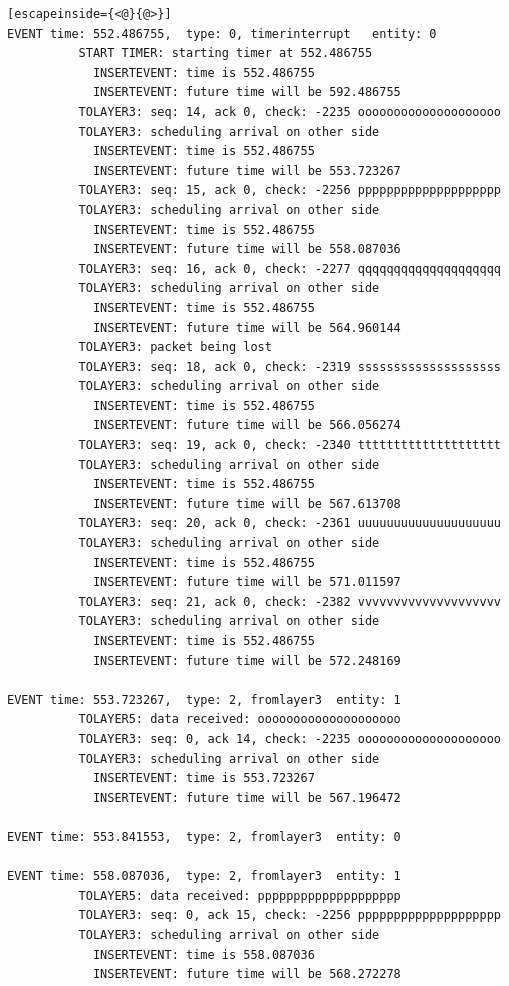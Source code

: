 \documentclass[paper=a4, fontsize=11pt]{scrartcl}
\numberwithin{equation}{section}		%
\numberwithin{figure}{section}			%
\numberwithin{table}{section}				%
\begin{document}
\begin{lstlisting}[escapeinside={<@}{@>}]
EVENT time: 552.486755,  type: 0, timerinterrupt   entity: 0
          START TIMER: starting timer at 552.486755
            INSERTEVENT: time is 552.486755
            INSERTEVENT: future time will be 592.486755
          TOLAYER3: seq: 14, ack 0, check: -2235 oooooooooooooooooooo
          TOLAYER3: scheduling arrival on other side
            INSERTEVENT: time is 552.486755
            INSERTEVENT: future time will be 553.723267
          TOLAYER3: seq: 15, ack 0, check: -2256 pppppppppppppppppppp
          TOLAYER3: scheduling arrival on other side
            INSERTEVENT: time is 552.486755
            INSERTEVENT: future time will be 558.087036
          TOLAYER3: seq: 16, ack 0, check: -2277 qqqqqqqqqqqqqqqqqqqq
          TOLAYER3: scheduling arrival on other side
            INSERTEVENT: time is 552.486755
            INSERTEVENT: future time will be 564.960144
          TOLAYER3: packet being lost
          TOLAYER3: seq: 18, ack 0, check: -2319 ssssssssssssssssssss
          TOLAYER3: scheduling arrival on other side
            INSERTEVENT: time is 552.486755
            INSERTEVENT: future time will be 566.056274
          TOLAYER3: seq: 19, ack 0, check: -2340 tttttttttttttttttttt
          TOLAYER3: scheduling arrival on other side
            INSERTEVENT: time is 552.486755
            INSERTEVENT: future time will be 567.613708
          TOLAYER3: seq: 20, ack 0, check: -2361 uuuuuuuuuuuuuuuuuuuu
          TOLAYER3: scheduling arrival on other side
            INSERTEVENT: time is 552.486755
            INSERTEVENT: future time will be 571.011597
          TOLAYER3: seq: 21, ack 0, check: -2382 vvvvvvvvvvvvvvvvvvvv
          TOLAYER3: scheduling arrival on other side
            INSERTEVENT: time is 552.486755
            INSERTEVENT: future time will be 572.248169

EVENT time: 553.723267,  type: 2, fromlayer3  entity: 1
          TOLAYER5: data received: oooooooooooooooooooo
          TOLAYER3: seq: 0, ack 14, check: -2235 oooooooooooooooooooo
          TOLAYER3: scheduling arrival on other side
            INSERTEVENT: time is 553.723267
            INSERTEVENT: future time will be 567.196472

EVENT time: 553.841553,  type: 2, fromlayer3  entity: 0

EVENT time: 558.087036,  type: 2, fromlayer3  entity: 1
          TOLAYER5: data received: pppppppppppppppppppp
          TOLAYER3: seq: 0, ack 15, check: -2256 pppppppppppppppppppp
          TOLAYER3: scheduling arrival on other side
            INSERTEVENT: time is 558.087036
            INSERTEVENT: future time will be 568.272278


\end{lstlisting}
\end{document}
